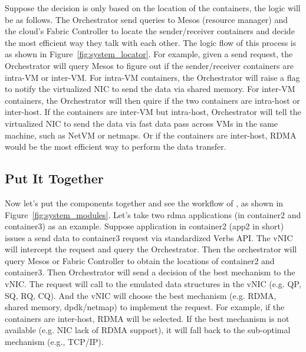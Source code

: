 Suppose the decision is only based on the location of the containers, the logic will be as follows.
The Orchestrator send queries to Mesos (resource manager) and the cloud's Fabric Controller to locate
the sender/receiver containers and decide the most efficient way they talk with each other.
The logic flow of this process is as shown in Figure~\ref{fig:system_locator}.
For example, given a send request, the Orchestrator will query Mesos to figure out if the 
sender/receiver containers are intra-VM or inter-VM. 
For intra-VM containers, the Orchestrator will raise a flag to notify the virtualized NIC to
send the data via shared memory.
For inter-VM containers, the Orchestrator will then quire if the two containers are intra-host
or inter-host.
If the containers are inter-VM but intra-host, Orchestrator will tell the virtualized NIC to send
the data via fast data pass across VMs in the same machine, such as NetVM\cite{} or netmaps\cite{}.
Or if the containers are inter-host, RDMA would be the most efficient way to perform the data transfer.



\subsection{Put It Together}
Now let's put the components together and see the workflow of \sysname, as shown in Figure~\ref{fig:system_modules}.
Let's take two rdma applications (in container2 and container3) as an example.
Suppose application in container2 (app2 in short) issues a send data to container3 request via standardized Verbs API.
The vNIC will intercept the request and query the Orchestrator. 
Then the orchestrator will query Mesos or Fabric Controller to obtain the locations of 
container2 and container3. Then Orchestrator will send a decision of the best mechanism to the vNIC.
The request will call to the emulated data structures in the vNIC (e.g. QP, SQ, RQ, CQ). And the vNIC will choose the
best mechanism (e.g. RDMA, shared memory, dpdk/netmap) to implement the request. For example, if the containers
are inter-host, RDMA will be selected. If the best mechanism is not available (e.g. NIC lack of RDMA support), it will
fall back to the sub-optimal mechanism (e.g., TCP/IP).

\fi
